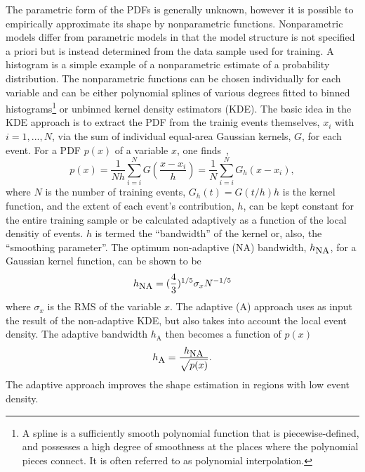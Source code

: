 The parametric form of the PDFs is generally unknown, however it is possible to empirically approximate its shape %
by nonparametric functions. Nonparametric models differ from parametric models in that the model structure is not specified a priori but is instead determined from the data sample used for training.  A histogram is a simple example of a nonparametric estimate of a probability distribution.   The nonparametric functions can be chosen individually for each variable and can be either polynomial splines of various degrees fitted to binned histograms\footnote{A spline is a sufficiently smooth polynomial function that is piecewise-defined, and possesses a high degree of smoothness at the places where the polynomial pieces connect. It is often referred to as polynomial interpolation. } or unbinned kernel density estimators (KDE). 
The basic idea in the KDE approach is to extract the PDF from the trainig events themselves, $x_i$ with $i=1,...,N$, via %
the sum of individual equal-area Gaussian kernels, $G$, for each event.
For a PDF $p(x)$ of a variable $x$, one finds~\cite{KDE},
%
\begin{equation}
p(x) = \frac{1}{N h} \sum^N_{i=i} G(\frac{x-x_i}{h}) = \frac{1}{N} \sum^N_{i=i} G_h(x-x_i),
\end{equation}
%
where $N$ is the number of training events, $G_h(t) = G(t/h)h$ is the kernel function,  %
and the extent of each event's contribution, $h$, can be kept constant for the entire training sample or be calculated adaptively as a function of the local densitiy of events. $h$ is termed the ``bandwidth'' of the kernel or, also, the ``smoothing parameter''.  The optimum non-adaptive (NA) bandwidth, $h_{\mbox{\small{NA}}}$, for a Gaussian kernel function, can be shown to be
%
\begin{equation}
h_{\mbox{\small{NA}}} = (\frac{4}{3})^{1/5} \sigma_x N^{-1/5}
\end{equation}
%
where $\sigma_x$ is the RMS of the variable $x$. The adaptive (A) approach uses as input the result of the non-adaptive KDE, but also takes into account the local event density.  The adaptive bandwidth $h_{\mbox{A}}$ then becomes a function of $p(x)$
%
\begin{equation}
h_{\mbox{\small{A}}} = \frac{h_{\mbox{\small{NA}}}}{\sqrt{p(x)}}.
\end{equation}
%
The adaptive approach improves the shape estimation in regions with low event density.


